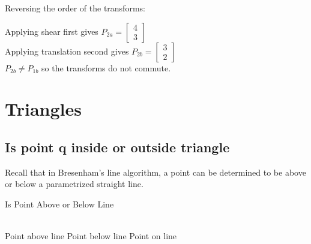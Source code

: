 \documentclass[a4paper,10pt]{scrartcl}
\begin{document}
Reversing the order of the transforms:

Applying shear first gives $P_{2a} = \begin{bmatrix} 4 \\ 3 \end{bmatrix}$ \\
Applying translation second gives  $P_{2b} = \begin{bmatrix} 3 \\ 2 \end{bmatrix}$ \\

$P_{2b} \neq P_{1b}$ so the transforms do not commute.

\section{Triangles}

\subsection{Is point q inside or outside triangle}

Recall that in Bresenham's line algorithm, a point can be determined to be above or below a parametrized straight line.

\begin{algorithm}[h!]
  \caption{Is Point Above or Below Line}\label{}
  
  \begin{algorithmic}
    \\
    \State Point above line
    \State   Point below line
    \Else 
    \State Point on line
    \EndIf\\
    \EndFunction
    
  \end{algorithmic}
\end{algorithm}
\end{document}
